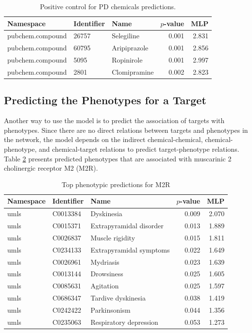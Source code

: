 \begin{table}
\centering
\begin{tabular}{|l|l|l|r|r|}
\hline
 \textbf{Namespace} & \textbf{Identifier} & \textbf{Name} & \textbf{$p$-value} & \textbf{MLP} \\
\hline
pubchem.compound & 26757 & Selegiline & 0.001 & 2.831 \\
\hline
pubchem.compound & 60795 &  Aripiprazole &  0.001 &  2.856 \\
\hline
pubchem.compound & 5095 & Ropinirole &  0.001 &  2.997 \\
\hline
pubchem.compound & 2801 & Clomipramine &  0.002 &  2.823 \\
\hline
\end{tabular}
 \caption{Positive control for PD chemicals predictions.}
    \label{tab:ps_PD}
\end{table}

\subsection{Predicting the Phenotypes for a Target }
Another way to use the model is to predict the association of targets with phenotypes. Since there are no direct relations between targets and phenotypes in the network, the model depends on the indirect chemical-chemical, chemical-phenotype, and chemical-target relations to predict target-phenotype relations. Table \ref{tab:target_phenotype} presents predicted phenotypes that are associated with muscarinic 2 cholinergic receptor M2 (M2R).

\begin{table}[h]
    \centering
    \begin{tabular}{ |l|l|l|r|r| } 
        \hline
        \textbf{Namespace} & \textbf{Identifier} & \textbf{Name} & \textbf{$p$-value} & \textbf{MLP} \\
        \hline
        umls & C0013384 & Dyskinesia &  0.009 &  2.070 \\
        \hline
        umls & C0015371 & Extrapyramidal disorder &  0.013 &  1.889 \\
        \hline
        umls & C0026837 & Muscle rigidity &  0.015 &  1.811 \\
        \hline
        umls & C0234133 & Extrapyramidal symptoms &  0.022 &  1.649 \\
        \hline
        umls &  C0026961 & Mydriasis &  0.023 &  1.639 \\
        \hline
        umls & C0013144 & Drowsiness &  0.025 &  1.605 \\
        \hline
        umls &  C0085631 & Agitation &  0.025 &  1.597 \\
        \hline
        umls &  C0686347 & Tardive dyskinesia &  0.038 &  1.419 \\
        \hline
        umls &  C0242422 & Parkinsonism &  0.044 &  1.356 \\
        \hline
        umls &  C0235063 & Respiratory depression &  0.053 &  1.273 \\
        \hline
    \end{tabular}
    \caption{Top phenotypic predictions for M2R}
    \label{tab:target_phenotype}
\end{table}


